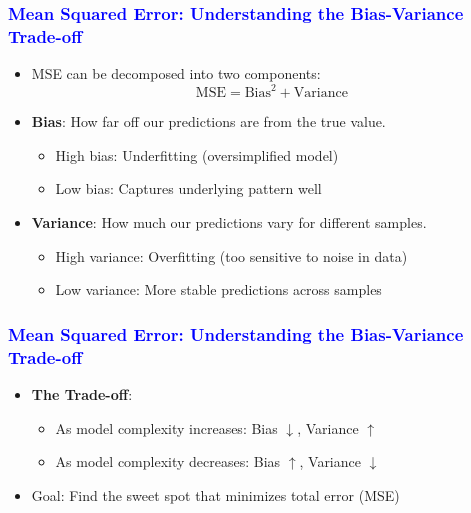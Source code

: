 \documentclass[12pt]{beamer}
\begin{document}
\begin{frame}
	\frametitle{\textcolor{blue}{Mean Squared Error: Understanding the Bias-Variance Trade-off}}
	
	\begin{itemize}[label={\color{blue}$\blacktriangleright$}]
		\item MSE can be decomposed into two components:
		\begin{equation*}
			\text{MSE} = \text{Bias}^2 + \text{Variance}
		\end{equation*}
		
		\item \textbf{Bias}: How far off our predictions are from the true value.
		\begin{itemize}
			\item High bias: Underfitting (oversimplified model)
			\item Low bias: Captures underlying pattern well
		\end{itemize}
		
		\item \textbf{Variance}: How much our predictions vary for different samples.
		\begin{itemize}
			\item High variance: Overfitting (too sensitive to noise in data)
			\item Low variance: More stable predictions across samples
		\end{itemize}
			\end{itemize}
		
		
	\end{frame}
\begin{frame}
	\frametitle{\textcolor{blue}{Mean Squared Error: Understanding the Bias-Variance Trade-off}}
	
	\begin{itemize}[label={\color{blue}$\blacktriangleright$}]
		\item \textbf{The Trade-off}:
		\begin{itemize}
			\item As model complexity increases: Bias $\downarrow$, Variance $\uparrow$
			\item As model complexity decreases: Bias $\uparrow$, Variance $\downarrow$
		\end{itemize}
		
		\item Goal: Find the sweet spot that minimizes total error (MSE)
	\end{itemize}
	

\end{frame}
\end{document}
